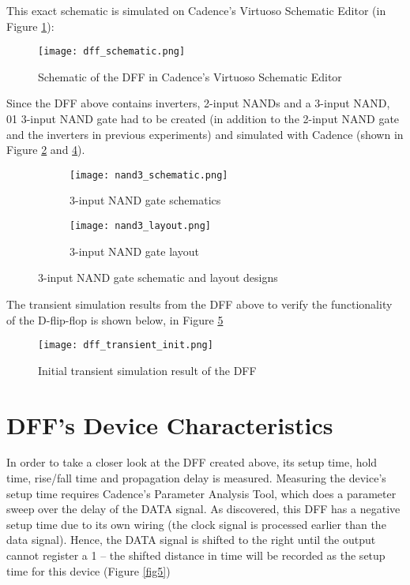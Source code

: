 \documentclass[letterpaper, 11pt]{article}
\begin{document}
This exact schematic is simulated on Cadence's Virtuoso Schematic Editor (in Figure \ref{fig2}):

\begin{figure}[htb!]
	\centering
	\texttt{[image: dff\_schematic.png]}
	\caption{Schematic of the DFF in Cadence's Virtuoso Schematic Editor}
	\label{fig2}
\end{figure}

Since the DFF above contains inverters, 2-input NANDs and a 3-input NAND, 01 3-input NAND gate had to be created (in addition to the 2-input NAND gate and the inverters in previous experiments) and simulated with Cadence (shown in Figure \ref{fig3a} and \ref{fig3b}).

\begin{figure}[ht!]
	\centering
	\begin{subfigure}[b]{.4\linewidth}
		\texttt{[image: nand3\_schematic.png]}
		\caption{3-input NAND gate schematics}
		\label{fig3a}
	\end{subfigure}
	\begin{subfigure}[b]{.3\linewidth}
		\texttt{[image: nand3\_layout.png]}
		\caption{3-input NAND gate layout}
		\label{fig3b}
	\end{subfigure}
	\caption{3-input NAND gate schematic and layout designs}
\end{figure}

The transient simulation results from the DFF above to verify the functionality of the D-flip-flop is shown below, in Figure \ref{fig4}

\begin{figure}[htb!]
	\centering
	\texttt{[image: dff\_transient\_init.png]}
	\caption{Initial transient simulation result of the DFF}
	\label{fig4}
\end{figure}

\section{DFF's Device Characteristics}
\label{sec:device_char}
In order to take a closer look at the DFF created above, its setup time, hold time, rise/fall time and propagation delay is measured. Measuring the device's setup time requires Cadence's Parameter Analysis Tool, which does a parameter sweep over the delay of the DATA signal. As discovered, this DFF has a negative setup time due to its own wiring (the clock signal is processed earlier than the data signal). Hence, the DATA signal is shifted to the right until the output cannot register a 1 -- the shifted distance in time will be recorded as the setup time for this device (Figure \ref{fig5})
\end{document}
